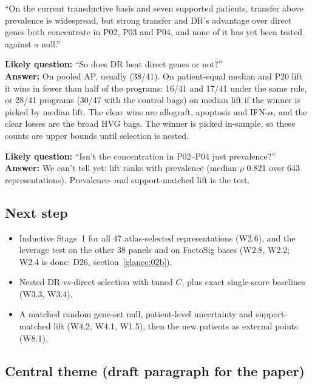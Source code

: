 \begin{teambox}
``On the current transductive basis and seven supported patients, transfer above prevalence is widespread, but strong transfer and DR's advantage over direct genes both concentrate in P02, P03 and P04, and none of it has yet been tested against a null.''

\textbf{Likely question:} ``So does DR beat direct genes or not?''\\
\textbf{Answer:} On pooled AP, usually (38/41). On patient-equal median and P20 lift it wins in fewer than half of the programs: 16/41 and 17/41 under the same rule, or 28/41 programs (30/47 with the control bags) on median lift if the winner is picked by median lift. The clear wins are allograft, apoptosis and IFN-$\alpha$, and the clear losses are the broad HVG bags. The winner is picked in-sample, so these counts are upper bounds until selection is nested.

\textbf{Likely question:} ``Isn't the concentration in P02--P04 just prevalence?''\\
\textbf{Answer:} We can't tell yet: lift ranks with prevalence (median $\rho$ 0.821 over 643 representations). Prevalence- and support-matched lift is the test.
\end{teambox}

\subsection*{Next step}
\begin{itemize}
\item Inductive Stage~1 for all 47 atlas-selected representations (W2.6), and the leverage test on the other 38 panels and on FactoSig bases (W2.8, W2.2; W2.4 is done: D26, section~\ref{glance:02b}).
\item Nested DR-vs-direct selection with tuned $C$, plus exact single-score baselines (W3.3, W3.4).
\item A matched random gene-set null, patient-level uncertainty and support-matched lift (W4.2, W4.1, W1.5), then the new patients as external points (W8.1).
\end{itemize}

\subsection{Central theme (draft paragraph for the paper)}

